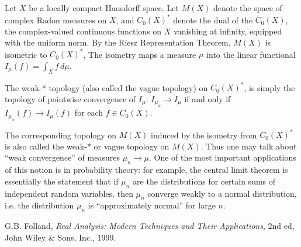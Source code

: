 \documentclass[12pt]{article}
\begin{document}
Let $X$ be a locally compact Hausdorff space.
Let $M(X)$ denote the space of complex Radon measures on $X$, and
$C_0(X)^*$ denote the dual of the $C_0(X)$, the complex-valued continuous functions on $X$
vanishing at infinity, equipped with the uniform norm.
By the Riesz Representation Theorem, $M(X)$ is isometric to $C_0(X)^*$,
The isometry maps a measure $\mu$ into the linear functional $I_\mu(f) = \int_X f \, d\mu$.

The weak-* topology (also called the vague topology) on $C_0(X)^*$,
is simply the topology of pointwise convergence of $I_\mu$: 
$I_{\mu_\alpha} \to I_{\mu}$ if and only if
$I_{\mu_\alpha}(f) \to I_{\mu}(f)$ for each $f \in C_0(X)$.

The corresponding topology on $M(X)$ induced by the isometry from $C_0(X)^*$ is also called
the weak-* or vague topology on $M(X)$.  Thus one may talk about ``weak convergence'' of measures 
$\mu_n \to \mu$.  One of the most important applications of this notion is in probability theory:
for example, the central limit theorem is essentially the statement that
if $\mu_n$ are the distributions for certain sums of independent random variables.
then $\mu_n$ converge weakly to a normal distribution,
i.e. the distribution $\mu_n$ is ``approximately normal'' for large $n$.

\begin{thebibliography}{9}
G.B. Folland, \emph{Real Analysis: Modern Techniques and Their Applications}, 2nd ed, John Wiley \& Sons, Inc., 1999.
\end{thebibliography}
\end{document}
